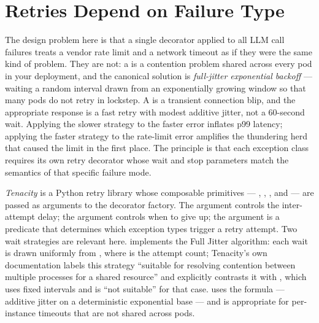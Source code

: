 \section{Retries Depend on Failure Type}
\label{sec:retries-depend-on-failure-type}

The design problem here is that a single  decorator applied
to all LLM call failures treats a vendor rate limit and a network timeout
as if they were the same kind of problem. They are not: a
 is a contention problem shared across every pod in
your deployment, and the canonical solution is \emph{full-jitter
exponential backoff} --- waiting a random interval drawn from an
exponentially growing window so that many pods do not retry in lockstep.
A  is a transient connection blip, and the appropriate
response is a fast retry with modest additive jitter, not a 60-second wait.
Applying the slower strategy to the faster error inflates p99 latency;
applying the faster strategy to the rate-limit error amplifies the
thundering herd that caused the limit in the first place. The principle is
that each exception class requires its own retry decorator whose wait and
stop parameters match the semantics of that specific failure mode.

\emph{Tenacity} is a Python retry library whose composable primitives ---
, , , and  --- are
passed as arguments to the  decorator factory. The 
argument controls the inter-attempt delay; the  argument controls
when to give up; the  argument is a predicate that determines
which exception types trigger a retry attempt. Two wait strategies are
relevant here.  implements the Full Jitter
algorithm: each wait is drawn uniformly from
, where  is the attempt count;
Tenacity's own documentation labels this strategy ``suitable for resolving
contention between multiple processes for a shared resource'' and explicitly
contrasts it with , which uses fixed intervals and
is ``not suitable'' for that case.  uses
the formula  ---
additive jitter on a deterministic exponential base --- and is appropriate
for per-instance timeouts that are not shared across pods.

